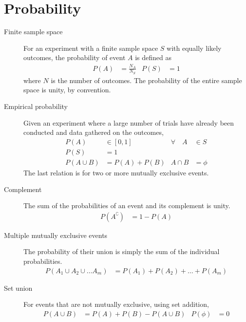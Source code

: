 \section{Probability}

\begin{description}
    \item[Finite sample space] For an experiment with a finite sample space $ S $ with
          equally likely outcomes, the probability of event $ A $ is defined as
          \begin{align}
              P(A) & = \frac{N_A}{N_S} & P(S) & = 1
          \end{align}
          where $ N $ is the number of outcomes. The probability of the entire sample
          space is unity, by convention.

    \item[Empirical probability] Given an experiment where a large number of trials
          have already been conducted and data gathered on the outcomes,
          \begin{align}
              P(A)        & \in [0,1]     & \forall \quad A & \in S  \\
              P(S)        & = 1                                      \\
              P(A \cup B) & = P(A) + P(B) & A \cap B        & = \phi
          \end{align}
          The last relation is for two or more mutually exclusive events.

    \item[Complement] The sum of the probabilities of an event and its complement
          is unity.
          \begin{align}
              P(A^\complement) & = 1 - P(A)
          \end{align}

    \item[Multiple mutually exclusive events] The probability of their union is
          simply the sum of the individual probabilities.
          \begin{align}
              P(A_1 \cup A_2 \cup \dots A_m) & = P(A_1) + P(A_2) + \dots + P(A_m)
          \end{align}

    \item[Set union] For events that are not mutually exclusive, using set addition,
          \begin{align}
              P(A \cup B) & = P(A) + P(B) - P(A \cup B) &
              P(\phi)     & = 0
          \end{align}


\end{description}
